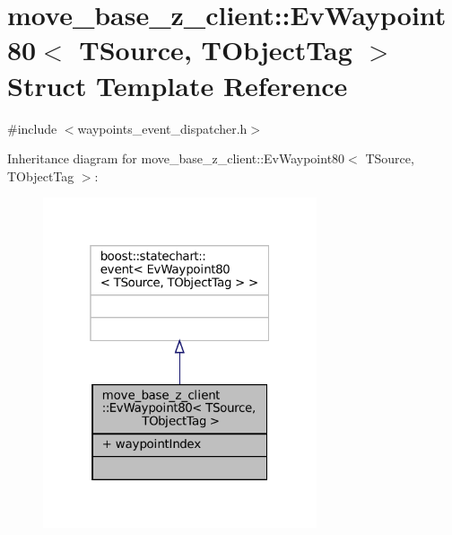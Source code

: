 \hypertarget{structmove__base__z__client_1_1EvWaypoint80}{}\section{move\+\_\+base\+\_\+z\+\_\+client\+:\+:Ev\+Waypoint80$<$ T\+Source, T\+Object\+Tag $>$ Struct Template Reference}
\label{structmove__base__z__client_1_1EvWaypoint80}


{\ttfamily \#include $<$waypoints\+\_\+event\+\_\+dispatcher.\+h$>$}



Inheritance diagram for move\+\_\+base\+\_\+z\+\_\+client\+:\+:Ev\+Waypoint80$<$ T\+Source, T\+Object\+Tag $>$\+:
\nopagebreak
\begin{figure}[H]
\begin{center}
\leavevmode
\includegraphics[width=229pt]{structmove__base__z__client_1_1EvWaypoint80__inherit__graph}
\end{center}
\end{figure}


